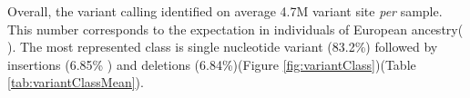 \documentclass[
tikz,
11pt, %
oneside, %
english, %
singlespacing, %
headsepline, %
]{MastersDoctoralThesisV2} %
\begin{document}
Overall, the variant calling identified on average 4.7M variant site \textit{per} sample. This number corresponds to the expectation in individuals of European ancestry( \cite{1000genome2015global}). The most represented class is single nucleotide variant (83.2\%) followed by insertions (6.85\% ) and deletions (6.84\%)(Figure \ref{fig:variantClass})(Table \ref{tab:variantClassMean}). \\

\end{document}
